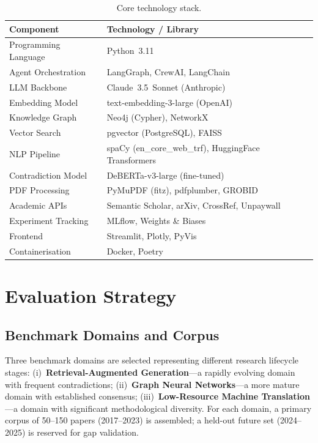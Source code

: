 \documentclass{llncs}
\begin{document}
\begin{table}[htbp]
\centering
\caption{Core technology stack.}
\label{tab:tools}
\begin{tabular}{ll}
\toprule
\textbf{Component} & \textbf{Technology / Library} \\
\midrule
Programming Language   & Python~3.11 \\
Agent Orchestration    & LangGraph, CrewAI, LangChain \\
LLM Backbone           & Claude~3.5~Sonnet (Anthropic) \\
Embedding Model        & text-embedding-3-large (OpenAI) \\
Knowledge Graph        & Neo4j (Cypher), NetworkX \\
Vector Search          & pgvector (PostgreSQL), FAISS \\
NLP Pipeline           & spaCy (en\_core\_web\_trf), HuggingFace Transformers \\
Contradiction Model    & DeBERTa-v3-large (fine-tuned) \\
PDF Processing         & PyMuPDF (fitz), pdfplumber, GROBID \\
Academic APIs          & Semantic Scholar, arXiv, CrossRef, Unpaywall \\
Experiment Tracking    & MLflow, Weights \& Biases \\
Frontend               & Streamlit, Plotly, PyVis \\
Containerisation       & Docker, Poetry \\
\bottomrule
\end{tabular}
\end{table}

\section{Evaluation Strategy}
\label{sec:evaluation}

\subsection{Benchmark Domains and Corpus}

Three benchmark domains are selected representing different research lifecycle
stages: (i)~\textbf{Retrieval-Augmented Generation}—a rapidly evolving domain
with frequent contradictions; (ii)~\textbf{Graph Neural Networks}—a more mature
domain with established consensus; (iii)~\textbf{Low-Resource Machine
Translation}—a domain with significant methodological diversity. For each domain,
a primary corpus of 50--150 papers (2017--2023) is assembled; a held-out future
set (2024--2025) is reserved for gap validation.
\end{document}
